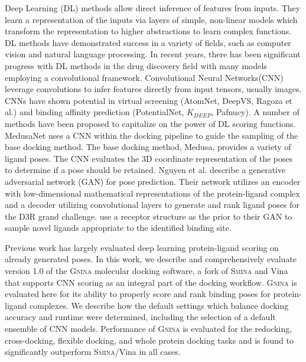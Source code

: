 \documentclass[journal=jcisd8,manuscript=article]{achemso}
\begin{document}
Deep Learning (DL) methods allow direct inference of features from inputs. They learn a representation of the inputs via layers of simple, non-linear models which transform the representation to higher abstractions to learn complex functions\cite{lecun2015deep}.  DL methods have demonstrated success in a variety of fields, such as computer vision and natural language processing\cite{krizhevsky2017imagenet,brown2020language}. In recent years, there has been significant progress with DL methods in the drug discovery field with many models employing a convolutional framework. Convolutional Neural Networks(CNN) leverage convolutions to infer features directly from input tensors, usually images. CNNs have shown potential in virtual screening (AtomNet\cite{wallach2015atomnet}, DeepVS\cite{pereira2016boosting}, Ragoza et al.\cite{Ragoza2017}) and binding affinity prediction (PotentialNet\cite{feinberg2018potentialnet}, $K_{DEEP}$\cite{jimenez2018k}, Pafnucy\cite{stepniewska2018development}). A number of methods have been proposed to capitalize on the power of DL scoring functions. MedusaNet uses a CNN within the docking pipeline to guide the sampling of the base docking method\cite{jiang2020guiding}. The base docking method, Medusa, provides a variety of ligand poses. The CNN evaluates the 3D coordinate representation of the poses to determine if a pose should be retained. Nguyen et al. \cite{nguyen2020mathdl} describe a generative adversarial network (GAN) for pose prediction. Their network utilizes an encoder with low-dimensional mathematical representations of the protein-ligand complex and a decoder utilizing convolutional layers to generate and rank ligand poses for the D3R grand challenge. \citet{masuda2020generating} use a receptor structure as the prior to their GAN to sample novel ligands appropriate to the identified binding site.

Previous work has largely evaluated deep learning protein-ligand scoring on already generated poses.
In this work, we describe and comprehensively evaluate version 1.0 of the \textsc{Gnina} molecular docking software, a fork of \textsc{Smina}\cite{koes2013lessons} and Vina\cite{trott2010autodock} that supports CNN scoring as an integral part of the docking workflow. \textsc{Gnina} is evaluated here for its ability to properly score and rank binding poses for protein-ligand complexes. We describe how the default settings which balance docking accuracy and runtime were determined, including the selection of a default ensemble of CNN models. Performance of \textsc{Gnina} is evaluated for the redocking, cross-docking, flexible docking, and whole protein docking tasks and is found to significantly outperform \textsc{Smina}/Vina in all cases.
\end{document}
